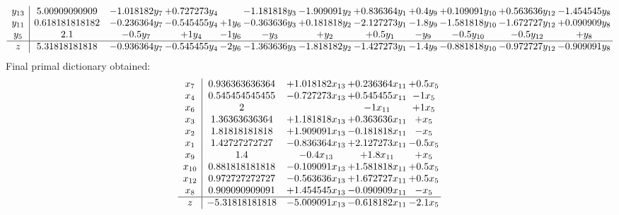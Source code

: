 \documentclass[11pt]{article}
\begin{document}
\[\begin{array}{c| c c@{\hskip 2pt} c@{\hskip 2pt} c@{\hskip 2pt} c@{\hskip 2pt} c@{\hskip 2pt} c@{\hskip 2pt} c@{\hskip 2pt} c@{\hskip 2pt} c@{\hskip 2pt} c@{\hskip 2pt} }
 y_{13}   &  5.00909090909 & -1.018182 y_{7} & + 0.727273 y_{4} &   & -1.181818 y_{3} & -1.909091 y_{2} & + 0.836364 y_{1} & + 0.4 y_{9} & + 0.109091 y_{10} & + 0.563636 y_{12} & -1.454545 y_{8}\\
 y_{11}   &  0.618181818182 & -0.236364 y_{7} & -0.545455 y_{4} & + 1 y_{6} & -0.363636 y_{3} & + 0.181818 y_{2} & -2.127273 y_{1} & -1.8 y_{9} & -1.581818 y_{10} & -1.672727 y_{12} & + 0.090909 y_{8}\\
 y_{5}   &  2.1 & -0.5 y_{7} & + 1 y_{4} & -1 y_{6} & - y_{3} & +  y_{2} & + 0.5 y_{1} & - y_{9} & -0.5 y_{10} & -0.5 y_{12} & +  y_{8}\\
\hline
z    &  5.31818181818 & -0.936364 y_{7} & -0.545455 y_{4} & -2 y_{6} & -1.363636 y_{3} & -1.818182 y_{2} & -1.427273 y_{1} & -1.4 y_{9} & -0.881818 y_{10} & -0.972727 y_{12} & -0.909091 y_{8}\\
\end{array}\]
 Final primal dictionary obtained: 
\[\begin{array}{c| c c@{\hskip 2pt} c@{\hskip 2pt} c@{\hskip 2pt} }
 x_{7}   &  0.936363636364 & + 1.018182 x_{13} & + 0.236364 x_{11} & + 0.5 x_{5}\\
 x_{4}   &  0.545454545455 & -0.727273 x_{13} & + 0.545455 x_{11} & -1 x_{5}\\
 x_{6}   &  2  &   & -1 x_{11} & + 1 x_{5}\\
 x_{3}   &  1.36363636364 & + 1.181818 x_{13} & + 0.363636 x_{11} & +  x_{5}\\
 x_{2}   &  1.81818181818 & + 1.909091 x_{13} & -0.181818 x_{11} & - x_{5}\\
 x_{1}   &  1.42727272727 & -0.836364 x_{13} & + 2.127273 x_{11} & -0.5 x_{5}\\
 x_{9}   &  1.4 & -0.4 x_{13} & + 1.8 x_{11} & +  x_{5}\\
 x_{10}   &  0.881818181818 & -0.109091 x_{13} & + 1.581818 x_{11} & + 0.5 x_{5}\\
 x_{12}   &  0.972727272727 & -0.563636 x_{13} & + 1.672727 x_{11} & + 0.5 x_{5}\\
 x_{8}   &  0.909090909091 & + 1.454545 x_{13} & -0.090909 x_{11} & - x_{5}\\
\hline
z    &  -5.31818181818 & -5.009091 x_{13} & -0.618182 x_{11} & -2.1 x_{5}\\
\end{array}\]
\end{document}
